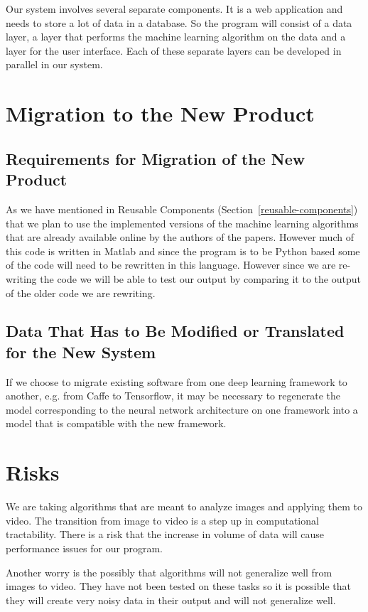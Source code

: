 \documentclass{scrreprt}
\begin{document}
{Our system involves several separate components. It is a web
application and needs to store a lot of data in a database. So the
program will consist of a data layer, a layer that performs the machine
learning algorithm on the data and a layer for the user interface. Each
of these separate layers can be developed in parallel in our system.}

\section{Migration to the New Product}

\subsection{Requirements for Migration of the New Product}

{As we have mentioned in Reusable Components
(Section~\ref{reusable-components}) that we plan to use the implemented
versions of the machine learning algorithms that are already available online
by the authors of the papers. However much of this code is written in Matlab
and since the program is to be Python based some of the code will need to be
rewritten in this language. However since we are re-writing the code we will be
able to test our output by comparing it to the output of the older code we are
rewriting.}

\subsection{Data That Has to Be Modified or Translated for the New
            System}

If we choose to migrate existing software from one deep learning framework to
another, e.g. from Caffe to Tensorflow, it may be necessary to regenerate the
model corresponding to the neural network architecture on one framework into a
model that is compatible with the new framework.

\section{Risks}

{We are taking algorithms that are meant to analyze images and applying
them to video. The transition from image to video is a step up in
computational tractability. There is a risk that the increase in volume
of data will cause performance issues for our program.}

{Another worry is the possibly that algorithms will not generalize well
from images to video. They have not been tested on these tasks so it is
possible that they will create very noisy data in their output and will
not generalize well.}
\end{document}
